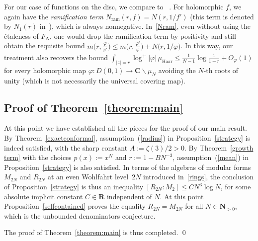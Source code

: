 \documentclass[10pt]{amsart}
\def\NwithoutzeroA{\mathbf{N}_{> 0}}
\renewcommand\setminus{\smallsetminus}
\def\R{\mathbf{R}}
\theoremstyle{remark}
\numberwithin{equation}{subsection}
\def\C{\mathbf{C}}
\begin{document}
For our case of functions on the disc, we compare to ~\cite[Theorem~2.1]{Hayman}. For holomorphic $f$, we again have the \emph{ramification term} $N_{\mathrm{ram}}(r, f) = 
N(r, 1/f')$ (this term is denoted by $N_1(r)$ in~\cite{Hayman}), which is always nonnegative. In~\eqref{Nram}, even without using the \'etaleness of $F_N$, one would drop the ramification term by positivity and still obtain the requisite bound $\displaystyle m\Big( r, \frac{\varphi}{\varphi'} \Big) \leq m\Big( r, \frac{\varphi'}{\varphi} \Big) + N\Big( r, 1/\varphi \Big)$. In this way, our treatment also recovers the bound $\int_{|z| = r} \log^+{|\varphi|} \, \mu_{\mathrm{Haar}} \leq  \frac{1}{N-1}\log{\frac{1}{1-r}} + O_{\varphi}(1)$ for every holomorphic map $\varphi : D(0,1) \to \C \setminus \mu_N$  avoiding the $N$-th roots of unity (which is not necessarily the universal covering map).



\subsection{Proof of Theorem~\ref{theorem:main}}  \label{putting together}
At this point we have established all the pieces for the proof of our main result. By Theorem~\ref{exactconformal}, 
assumption~(\ref{radius}) in Proposition~\ref{strategy} is indeed satisfied, with the sharp constant $A := \zeta(3)/2 > 0$. By Theorem~\ref{growth term} with the choices $p(x) := x^N$ and $r := 1 - BN^{-3}$, assumption~(\ref{mean}) in Proposition~\ref{strategy} is also satisfied. In terms of the algebras of modular forms $M_{2N}$ and $R_{2N}$ at an even Wohlfahrt level~$2N$ introduced in~\ref{rings}, the conclusion of Proposition~\ref{strategy} is thus an inequality $[R_{2N}:M_2] \leq C N^3 \log{N}$, for some absolute implicit constant $C \in \R$ independent of $N$. At this point Proposition~\ref{selfcontained} proves the equality $R_{2N} = M_{2N}$ for all $N \in \NwithoutzeroA$, which is the unbounded denominators conjecture. 

\medskip

The proof of Theorem~\ref{theorem:main} is thus completed.     \qed
\end{document}
